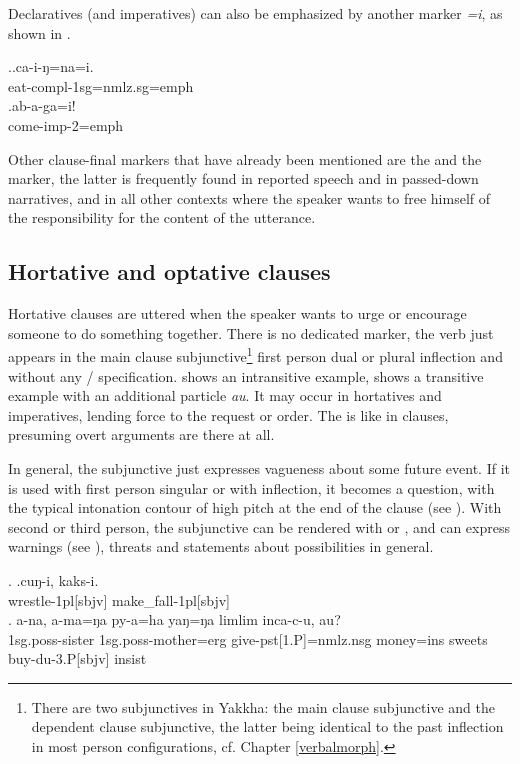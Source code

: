 Declaratives (and imperatives) can also be emphasized by another marker \emph{=i}, as shown in \Next. 

\ex.\ag.ca-i-ŋ=na=i.\\
eat{\sc -compl-1sg=nmlz.sg=emph}\\
 
\bg.ab-a-ga=i!\\
come{\sc -imp-2=emph}\\

Other clause-final markers that have already been mentioned are the  and the  marker, the latter is frequently found in reported speech and in passed-down narratives, and in all other contexts where the speaker wants to free himself of the responsibility for the content of the utterance.

 
\subsection{Hortative and optative clauses}\label{clstr-opt}
 
Hortative clauses are uttered when the speaker wants to urge or encourage someone to do something together. There is no dedicated  marker, the verb just appears in the main clause subjunctive\footnote{There are two subjunctives in Yakkha: the main clause subjunctive and the dependent clause subjunctive, the latter being  identical to the past inflection in most person configurations, cf. Chapter \ref{verbalmorph}.}  first person dual or plural inflection and without any / specification. \Next[a] shows an intransitive example, \Next[b] shows a transitive example with an additional particle \emph{au}. It may occur in hortatives and imperatives, lending force to the request or order.  The  is like in  clauses, presuming  overt arguments are there at all.

In general, the subjunctive just expresses vagueness about some future event. If it is used with first person singular or with  inflection, it becomes a  question, with the typical intonation contour of high pitch at the end of the clause (see \NNext[a]). With second or third person,  the subjunctive can be rendered with  or , and can express warnings (see \NNext[b]), threats \NNext[c] and statements about possibilities in general. 

\ex. \ag.cuŋ-i,    kaks-i.\\
wrestle{\sc -1pl[sbjv]} make\_fall{\sc -1pl[sbjv]}\\
 
\bg. a-na,     a-ma=ŋa                py-a=ha   yaŋ=ŋa    limlim inca-c-u,       au?\\
{\sc 1sg.poss-}sister {\sc 1sg.poss-}mother{\sc =erg} give{\sc -pst[1.P]=nmlz.nsg} money{\sc =ins} sweets buy{\sc -du-3.P[sbjv]} {\sc insist}\\
 

